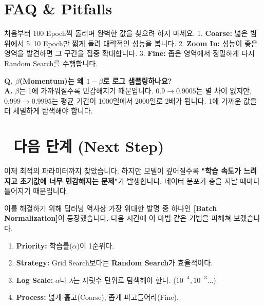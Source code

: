 \documentclass[11pt,a4paper]{book}
\theoremstyle{definition}
\begin{document}
\section{FAQ \& Pitfalls}

\begin{tipbox}[title={Coarse to Fine 전략}]
처음부터 100 Epoch씩 돌리며 완벽한 값을 찾으려 하지 마세요.
1. \textbf{Coarse:} 넓은 범위에서 5~10 Epoch만 짧게 돌려 대략적인 성능을 봅니다.
2. \textbf{Zoom In:} 성능이 좋은 영역을 발견하면 그 구간을 집중 확대합니다.
3. \textbf{Fine:} 좁은 영역에서 정밀하게 다시 Random Search를 수행합니다.
\end{tipbox}

\textbf{Q. $\beta$(Momentum)는 왜 $1-\beta$로 로그 샘플링하나요?} \\
\textbf{A.} $\beta$는 1에 가까워질수록 민감해지기 때문입니다.
$0.9 \to 0.9005$는 별 차이 없지만, $0.999 \to 0.9995$는 평균 기간이 1000일에서 2000일로 2배가 됩니다. 1에 가까운 값을 더 세밀하게 탐색해야 합니다.

\section*{🔗 다음 단계 (Next Step)}
이제 최적의 파라미터까지 찾았습니다. 하지만 모델이 깊어질수록 \textbf{"학습 속도가 느려지고 초기값에 너무 민감해지는 문제"}가 발생합니다. 데이터 분포가 층을 지날 때마다 틀어지기 때문입니다.

이를 해결하기 위해 딥러닝 역사상 가장 위대한 발명 중 하나인 \textbf{[Batch Normalization]}이 등장했습니다. 다음 시간에 이 마법 같은 기법을 파헤쳐 보겠습니다.

\vspace{0.5cm}

\begin{summarybox}[title={단원 요약 (Cheat Sheet)}]
\begin{enumerate}
    \item \textbf{Priority:} 학습률($\alpha$)이 1순위다.
    \item \textbf{Strategy:} Grid Search보다는 \textbf{Random Search}가 효율적이다.
    \item \textbf{Log Scale:} $\alpha$나 $\lambda$는 자릿수 단위로 탐색해야 한다. ($10^{-4}, 10^{-3}\dots$)
    \item \textbf{Process:} 넓게 훑고(Coarse), 좁게 파고들어라(Fine).
\end{enumerate}
\end{summarybox}
\end{document}
